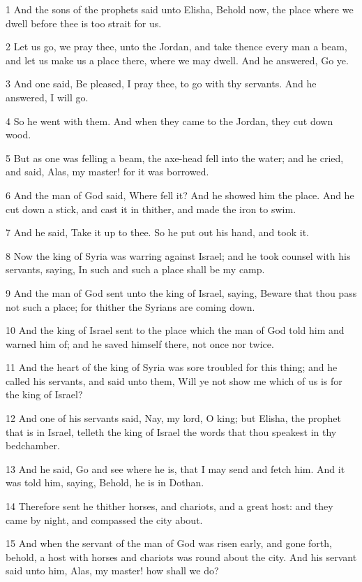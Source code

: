 \par 1 And the sons of the prophets said unto Elisha, Behold now, the place where we dwell before thee is too strait for us.
\par 2 Let us go, we pray thee, unto the Jordan, and take thence every man a beam, and let us make us a place there, where we may dwell. And he answered, Go ye.
\par 3 And one said, Be pleased, I pray thee, to go with thy servants. And he answered, I will go.
\par 4 So he went with them. And when they came to the Jordan, they cut down wood.
\par 5 But as one was felling a beam, the axe-head fell into the water; and he cried, and said, Alas, my master! for it was borrowed.
\par 6 And the man of God said, Where fell it? And he showed him the place. And he cut down a stick, and cast it in thither, and made the iron to swim.
\par 7 And he said, Take it up to thee. So he put out his hand, and took it.
\par 8 Now the king of Syria was warring against Israel; and he took counsel with his servants, saying, In such and such a place shall be my camp.
\par 9 And the man of God sent unto the king of Israel, saying, Beware that thou pass not such a place; for thither the Syrians are coming down.
\par 10 And the king of Israel sent to the place which the man of God told him and warned him of; and he saved himself there, not once nor twice.
\par 11 And the heart of the king of Syria was sore troubled for this thing; and he called his servants, and said unto them, Will ye not show me which of us is for the king of Israel?
\par 12 And one of his servants said, Nay, my lord, O king; but Elisha, the prophet that is in Israel, telleth the king of Israel the words that thou speakest in thy bedchamber.
\par 13 And he said, Go and see where he is, that I may send and fetch him. And it was told him, saying, Behold, he is in Dothan.
\par 14 Therefore sent he thither horses, and chariots, and a great host: and they came by night, and compassed the city about.
\par 15 And when the servant of the man of God was risen early, and gone forth, behold, a host with horses and chariots was round about the city. And his servant said unto him, Alas, my master! how shall we do?

